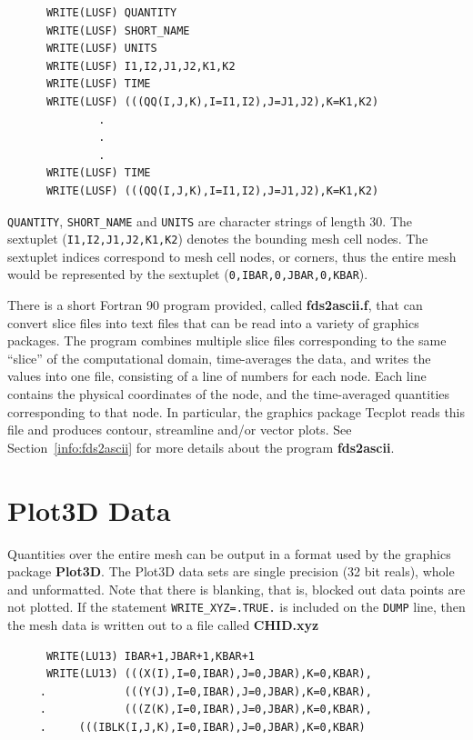 \documentclass[11pt]{book}
\newcommand{\ct}{\tt\small}
\begin{document}
\footnotesize
\begin{verbatim}
      WRITE(LUSF) QUANTITY
      WRITE(LUSF) SHORT_NAME
      WRITE(LUSF) UNITS
      WRITE(LUSF) I1,I2,J1,J2,K1,K2
      WRITE(LUSF) TIME
      WRITE(LUSF) (((QQ(I,J,K),I=I1,I2),J=J1,J2),K=K1,K2)
              .
              .
              .
      WRITE(LUSF) TIME
      WRITE(LUSF) (((QQ(I,J,K),I=I1,I2),J=J1,J2),K=K1,K2)
\end{verbatim}
\normalsize
{\ct QUANTITY}, {\ct SHORT\_NAME} and {\ct UNITS} are
character strings of length 30.
The sextuplet ({\ct I1,I2,J1,J2,K1,K2}) denotes the bounding mesh cell
nodes. The sextuplet indices correspond to mesh cell
nodes, or corners, thus the entire mesh would be represented by the
sextuplet ({\ct 0,IBAR,0,JBAR,0,KBAR}).

There is a short Fortran 90 program provided, called
{\bf fds2ascii.f},
that can convert slice files into text files that can be read
into a variety of graphics packages. The program combines multiple
slice files corresponding to the same ``slice'' of the computational
domain, time-averages the data, and writes the values into one file,
consisting of a line of numbers for each node. Each line contains the
physical coordinates of the node, and the time-averaged quantities
corresponding to that node. In particular, the graphics package
Tecplot
reads this file and produces contour, streamline and/or vector plots.
See Section~\ref{info:fds2ascii} for more details about the program
{\bf fds2ascii}.

\section{Plot3D Data}
\label{out:PL3D}

Quantities over the entire mesh can be output in a format used by the graphics package {\bf Plot3D}.
The Plot3D data sets are single precision (32 bit reals), whole and
unformatted. Note that there is blanking, that is,
blocked out data points are not plotted.
If the statement {\ct WRITE\_XYZ=.TRUE.} is included on the {\ct DUMP}
line, then the mesh data is written out to a file called {\bf CHID.xyz}

\footnotesize
\begin{verbatim}
      WRITE(LU13) IBAR+1,JBAR+1,KBAR+1
      WRITE(LU13) (((X(I),I=0,IBAR),J=0,JBAR),K=0,KBAR),
     .            (((Y(J),I=0,IBAR),J=0,JBAR),K=0,KBAR),
     .            (((Z(K),I=0,IBAR),J=0,JBAR),K=0,KBAR),
     .     (((IBLK(I,J,K),I=0,IBAR),J=0,JBAR),K=0,KBAR)
\end{verbatim}
\normalsize
\end{document}
